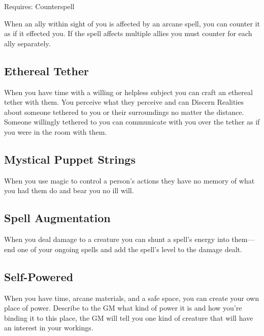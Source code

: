 Requires: Counterspell

         

When an ally within sight of you is affected by an arcane spell, you can counter it as if it effected you. If the spell affects multiple allies you must counter for each ally separately.

         
\subsection{Ethereal Tether}    
         

When you have time with a willing or helpless subject you can craft an ethereal tether with them. You perceive what they perceive and can Discern Realities about someone tethered to you or their surroundings no matter the distance. Someone willingly tethered to you can communicate with you over the tether as if you were in the room with them.

         
\subsection{Mystical Puppet Strings}     
         

When you use magic to control a person's actions they have no memory of what you had them do and bear you no ill will.

         
\subsection{Spell Augmentation}    
         

When you deal damage to a creature you can shunt a spell's energy into them—end one of your ongoing spells and add the spell's level to the damage dealt.

         
\subsection{Self-Powered}   
         

When you have time, arcane materials, and a safe space, you can create your own place of power. Describe to the GM what kind of power it is and how you're binding it to this place, the GM will tell you one kind of creature that will have an interest in your workings.

